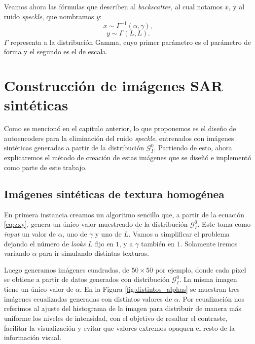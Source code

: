 Veamos ahora las fórmulas que describen al \emph{backscatter}, al cual notamos $x$, y al ruido \emph{speckle}, que nombramos $y$:
\begin{equation}\label{eq:backsacatter}
    x \sim \Gamma^{-1}(\alpha, \gamma),
\end{equation}
\begin{equation}\label{eq:ruido_speckle}
    y \sim \Gamma(L, L).
\end{equation}
$\Gamma$ representa a la distribución Gamma, cuyo primer parámetro es el parámetro de forma y el segundo es el de escala.

\section{Construcción de imágenes SAR sintéticas}\label{sec:construccion_imagenes_SAR}

Como se mencionó en el capítulo anterior, lo que proponemos es el diseño de autoencoders para la eliminación del ruido \emph{speckle}, entrenados con imágenes sintéticas generadas a partir de la distribución \( \mathcal{G}_I^0 \). Partiendo de esto, ahora explicaremos el método de creación de estas imágenes que se diseñó e implementó como parte de este trabajo.

\subsection{Imágenes sintéticas de textura homogénea}\label{subsec:imagenes_homogeneas}

En primera instancia creamos un algoritmo sencillo que, a partir de la ecuación \ref{eq:zxy}, genera un único valor muestreado de la distribución \( \mathcal{G}_I^0 \). Este toma como \emph{input} un valor de $\alpha$, uno de $\gamma$ y uno de $L$. Vamos a simplificar el problema dejando el número de \emph{looks} $L$ fijo en $1$, y a $\gamma$ también en $1$. Solamente iremos variando $\alpha$ para ir simulando distintas texturas.

Luego generamos imágenes cuadradas, de $50\times50$ por ejemplo, donde cada píxel se obtiene a partir de datos generados con distribución \( \mathcal{G}_I^0 \). La misma imagen tiene un único valor de $\alpha$. En la Figura \ref{fig:distintos_alphas} se muestran tres imágenes ecualizadas generadas con distintos valores de $\alpha$. Por ecualización nos referimos al ajuste del histograma de la imagen para distribuir de manera más uniforme los niveles de intensidad, con el objetivo de resaltar el contraste, facilitar la visualización y evitar que valores extremos opaquen el resto de la información visual.

